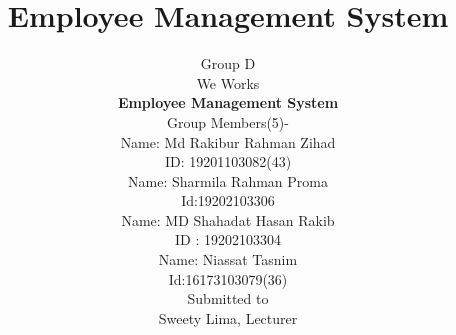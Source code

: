 \documentclass{article}
\begin{document}
\title{ \textbf{Employee Management System}}
\begin{center}
\author{Group D\\
We Works\\ \textbf{Employee Management System}\\ Group Members(5)-\\Name: Md Rakibur Rahman Zihad\\ ID: 19201103082(43)\\ Name: Sharmila Rahman Proma\\ Id:19202103306 \\ Name: MD Shahadat Hasan Rakib\\ID : 19202103304\\ Name: Niassat Tasnim \\Id:16173103079(36) \\
Submitted to\\ Sweety Lima, Lecturer
}
\end{center}
\cleardoublepage
\maketitle
\tableofcontents
\newpage
\end{document}
